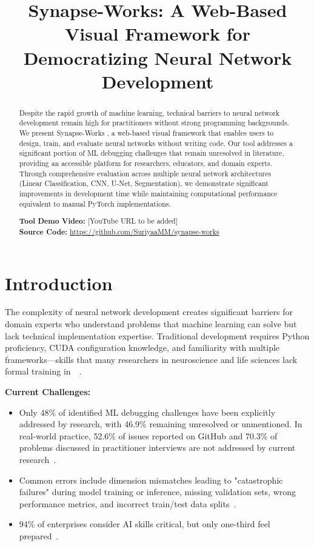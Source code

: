 \documentclass[10pt,conference]{IEEEtran}
\title{Synapse-Works: A Web-Based Visual Framework for Democratizing Neural Network Development}
\author{
    \IEEEauthorblockN{Dhanya V\IEEEauthorrefmark{1}, Suriyaa MM\IEEEauthorrefmark{1}}
    \IEEEauthorblockA{\IEEEauthorrefmark{1}Indian Institute of Technology Tirupati\\
        Tirupati, India\\
        Email: \{dhanya.v, suriyaa.mm\}@iittp.ac.in}
}
\newcommand{\synapse}{Synapse-Works }
\begin{document}
\maketitle

\begin{abstract}
    Despite the rapid growth of machine learning, technical barriers to neural network development remain high for practitioners without strong programming backgrounds. We present \synapse, a web-based visual framework that enables users to design, train, and evaluate neural networks without writing code. Our tool addresses a significant portion of ML debugging challenges that remain unresolved in literature, providing an accessible platform for researchers, educators, and domain experts. Through comprehensive evaluation across multiple neural network architectures (Linear Classification, CNN, U-Net, Segmentation), we demonstrate significant improvements in development time while maintaining computational performance equivalent to manual PyTorch implementations.

    \textbf{Tool Demo Video:} [YouTube URL to be added]\\
    \textbf{Source Code:} \url{https://github.com/SuriyaaMM/synapse-works}
\end{abstract}

\section{Introduction}
The complexity of neural network development creates significant barriers for
domain experts who understand problems that machine learning can solve but lack
technical implementation expertise. Traditional development requires Python
proficiency, CUDA configuration knowledge, and familiarity with multiple
frameworks—skills that many researchers in neuroscience and life sciences lack
formal training
in~\cite{undergrad_quant_neuro_2015}~\cite{python_in_quant_neuro_2015}.

\textbf{Current Challenges:}
\begin{itemize}
    \item Only 48\% of identified ML debugging challenges have been explicitly addressed
          by research, with 46.9\% remaining unresolved or unmentioned. In real-world
          practice, 52.6\% of issues reported on GitHub and 70.3\% of problems discussed
          in practitioner interviews are not addressed by current
          research~\cite{nguyen2025systematicsurveydebuggingtechniques}.
    \item Common errors include dimension mismatches leading to "catastrophic failures"
          during model training or inference, missing validation sets, wrong performance
          metrics, and incorrect train/test data
          splits~\cite{nguyen2025systematicsurveydebuggingtechniques}.
    \item 94\% of enterprises consider AI skills critical, but only one-third feel prepared~\cite{IDC2025AISkillsGap}.
\end{itemize}
\end{document}
